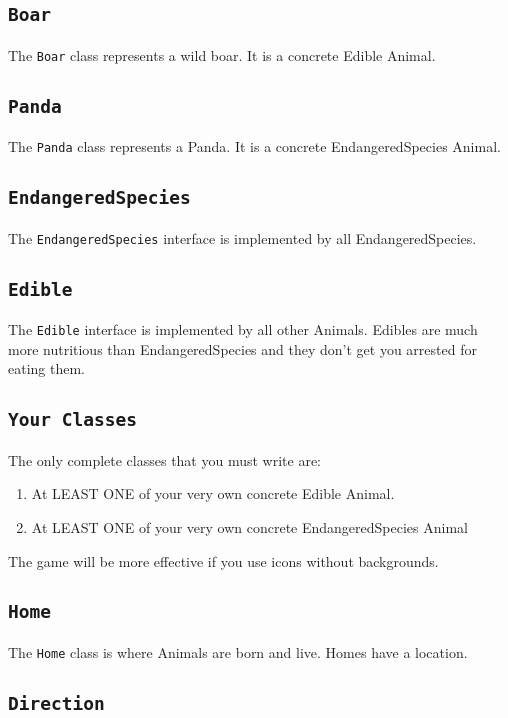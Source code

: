 \documentclass[12pt]{article}
\begin{document}
\subsection{{\tt Boar}}

The {\tt Boar} class represents a wild boar.  It is a concrete Edible Animal.


\subsection{{\tt Panda}}

The {\tt Panda} class represents a Panda.  It is a concrete EndangeredSpecies Animal.

\subsection{{\tt EndangeredSpecies}}

The {\tt EndangeredSpecies} interface is implemented by all EndangeredSpecies.

\subsection{{\tt Edible}}

The {\tt Edible} interface is implemented by all other Animals.  Edibles are much more nutritious than EndangeredSpecies and they don't get you arrested for eating them.


\subsection{{\tt Your Classes}}

The only complete classes that you must write are:
\begin{enumerate}
    \item At LEAST ONE of your very own concrete Edible Animal.
    \item At LEAST ONE of your very own concrete EndangeredSpecies Animal
    \end{enumerate}
The game will be more effective if you use icons without backgrounds.

\subsection{{\tt Home}}

The {\tt Home} class is where Animals are born and live.  Homes have a location.

\subsection{{\tt Direction}}
\end{document}
